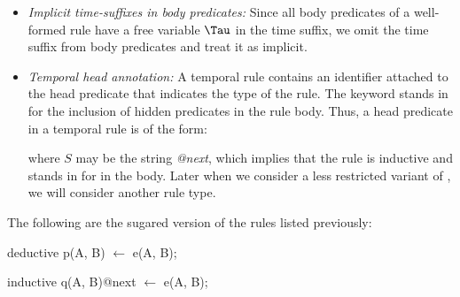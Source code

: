 \begin{itemize}
%
%
\item {\em Implicit time-suffixes in body predicates:} Since all body
predicates of a well-formed rule have a free variable $\Tau$ in the time
suffix, we omit the time suffix from body predicates and treat it as implicit.
%
\item {\em Temporal head annotation:} A temporal rule contains an identifier
attached to the head predicate that indicates 
the type of the rule. 
The keyword stands in for the inclusion of hidden predicates in the rule body.
Thus, a head predicate in a \slang temporal rule is of the form:


where $S$ 
may be the string \emph{@next}, which implies that the rule is inductive
and stands in for  in the body.
Later when we consider a less restricted variant of \lang, we will consider 
another rule type.


%
%
%
%
%
\end{itemize}


\begin{example}

The following are the sugared version of the rules listed previously:

\begin{Dedalus}
deductive
p(A, B) \(\leftarrow\)
  e(A, B);
  
inductive 
q(A, B)@next \(\leftarrow\)
  e(A, B);
  
    
\end{Dedalus}


\end{example}


